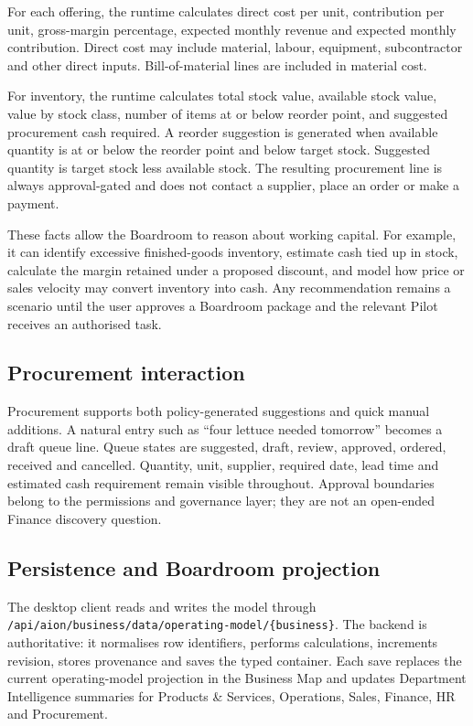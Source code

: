 For each offering, the runtime calculates direct cost per unit, contribution per unit, gross-margin percentage, expected monthly revenue and expected monthly contribution.  Direct cost may include material, labour, equipment, subcontractor and other direct inputs.  Bill-of-material lines are included in material cost.

For inventory, the runtime calculates total stock value, available stock value, value by stock class, number of items at or below reorder point, and suggested procurement cash required.  A reorder suggestion is generated when available quantity is at or below the reorder point and below target stock.  Suggested quantity is target stock less available stock.  The resulting procurement line is always approval-gated and does not contact a supplier, place an order or make a payment.

These facts allow the Boardroom to reason about working capital.  For example, it can identify excessive finished-goods inventory, estimate cash tied up in stock, calculate the margin retained under a proposed discount, and model how price or sales velocity may convert inventory into cash.  Any recommendation remains a scenario until the user approves a Boardroom package and the relevant Pilot receives an authorised task.

\subsection{Procurement interaction}

Procurement supports both policy-generated suggestions and quick manual additions.  A natural entry such as ``four lettuce needed tomorrow'' becomes a draft queue line.  Queue states are suggested, draft, review, approved, ordered, received and cancelled.  Quantity, unit, supplier, required date, lead time and estimated cash requirement remain visible throughout.  Approval boundaries belong to the permissions and governance layer; they are not an open-ended Finance discovery question.

\subsection{Persistence and Boardroom projection}

The desktop client reads and writes the model through \texttt{/api/aion/business/data/operating-model/\{business\}}.  The backend is authoritative: it normalises row identifiers, performs calculations, increments revision, stores provenance and saves the typed container.  Each save replaces the current operating-model projection in the Business Map and updates Department Intelligence summaries for Products \& Services, Operations, Sales, Finance, HR and Procurement.

